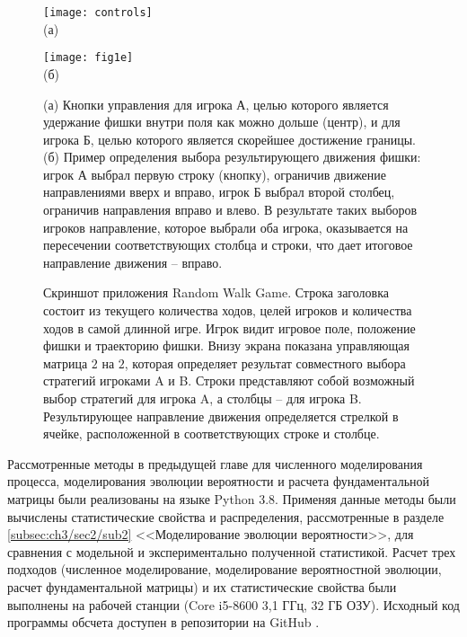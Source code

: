\begin{figure}[ht]
    \begin{minipage}[b][][b]{0.49\linewidth}\centering
        \texttt{[image: controls]} \\ (а)
    \end{minipage}
    \hfill
    \begin{minipage}[b][][b]{0.49\linewidth}\centering
        \texttt{[image: fig1e]} \\ (б)
    \end{minipage}
    \caption{
        (а) Кнопки управления для игрока А, целью которого является удержание фишки внутри поля как можно дольше (центр), и для игрока Б, целью которого является скорейшее достижение границы. (б) Пример определения выбора результирующего движения фишки: игрок А выбрал первую строку (кнопку), ограничив движение направлениями вверх и вправо, игрок Б выбрал второй столбец, ограничив направления вправо и влево. В результате таких выборов игроков направление, которое выбрали оба игрока, оказывается на пересечении соответствующих столбца и строки, что дает итоговое направление движения -- вправо.
    }
    \label{fig:controls}
\end{figure}


\begin{figure}[ht]
    \caption{
        Скриншот приложения Random Walk Game. Строка заголовка состоит из текущего количества ходов, целей игроков и количества ходов в самой длинной игре. Игрок видит игровое поле, положение фишки и траекторию фишки. Внизу экрана показана управляющая матрица $2$ на $2$, которая определяет результат совместного выбора стратегий игроками A и B. Строки представляют собой возможный выбор стратегий для игрока A, а столбцы -- для игрока B. Результирующее направление движения определяется стрелкой в ячейке, расположенной в соответствующих строке и столбце.
    }\label{fig:screenshot_game_field}
\end{figure}


Рассмотренные методы в предыдущей главе для численного моделирования процесса, моделирования эволюции вероятности и расчета фундаментальной матрицы были реализованы на языке Python 3.8. Применяя данные методы были вычислены статистические свойства и распределения, рассмотренные в разделе \cref{subsec:ch3/sec2/sub2} <<Моделирование эволюции вероятности>>, для сравнения с модельной и экспериментально полученной статистикой. Расчет трех подходов (численное моделирование, моделирование вероятностной эволюции, расчет фундаментальной матрицы) и их статистические свойства были выполнены на рабочей станции (Core i5-8600 3,1 ГГц, 32 ГБ ОЗУ). Исходный код программы обсчета доступен в репозитории на GitHub \cite{RWAnalyzer}.

